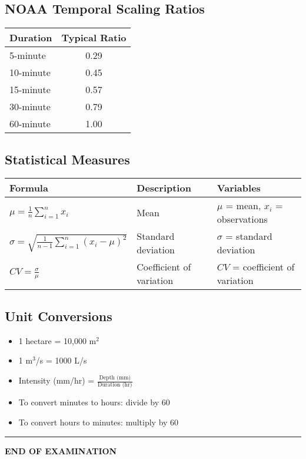 \documentclass[11pt,a4paper]{article}
\begin{document}
\subsection*{NOAA Temporal Scaling Ratios}
\begin{tabular}{|l|c|}
\hline
\textbf{Duration} & \textbf{Typical Ratio} \\
\hline
5-minute & 0.29 \\
10-minute & 0.45 \\
15-minute & 0.57 \\
30-minute & 0.79 \\
60-minute & 1.00 \\
\hline
\end{tabular}

\subsection*{Statistical Measures}
\begin{tabular}{|l|l|l|}
\hline
\textbf{Formula} & \textbf{Description} & \textbf{Variables} \\
\hline
$\mu = \frac{1}{n}\sum_{i=1}^{n} x_i$ & Mean & $\mu$ = mean, $x_i$ = observations \\
$\sigma = \sqrt{\frac{1}{n-1}\sum_{i=1}^{n}(x_i-\mu)^2}$ & Standard deviation & $\sigma$ = standard deviation \\
$CV = \frac{\sigma}{\mu}$ & Coefficient of variation & $CV$ = coefficient of variation \\
\hline
\end{tabular}

\subsection*{Unit Conversions}
\begin{itemize}[nosep]
    \item 1 hectare = 10,000 m$^2$
    \item 1 m$^3$/s = 1000 L/s
    \item Intensity (mm/hr) = $\frac{\text{Depth (mm)}}{\text{Duration (hr)}}$
    \item To convert minutes to hours: divide by 60
    \item To convert hours to minutes: multiply by 60
\end{itemize}

\vspace{0.5cm}
\hrule
\vspace{0.3cm}
\begin{center}
\textbf{END OF EXAMINATION}
\end{center}
\end{document}

